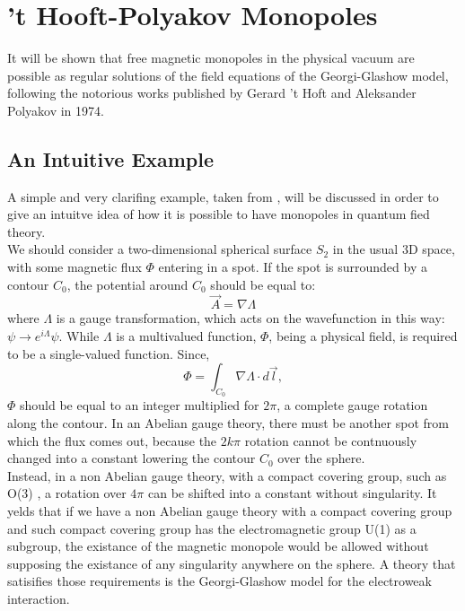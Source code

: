 \documentclass[main.tex]{subfiles}
\begin{document}
\section{’t Hooft-Polyakov Monopoles}
It will be shown that free magnetic monopoles in the physical vacuum are possible as regular solutions of the field equations of the Georgi-Glashow model, following the notorious works published by Gerard 't Hoft \cite{Hof:Mon} and Aleksander Polyakov \cite{Pol:Mon} in 1974. 
\subsection{An Intuitive Example}
A simple and very clarifing example, taken from \cite{Hof:Mon}, will be discussed in order to give an intuitve idea of how it is possible to have monopoles in quantum fied theory.  \\
We should consider a two-dimensional spherical surface $S_2$ in the usual 3D space, with some magnetic flux $\Phi$ entering in a spot. If the spot is surrounded by a contour $C_0$, the potential around $C_0$ should be equal to: 
\begin{equation}
    \Vec{A}= \nabla \Lambda 
\end{equation}
where $\Lambda$ is a gauge transformation, which acts on the wavefunction in this way: $\psi \rightarrow e^{i\Lambda} \psi $. 
While $\Lambda$ is a multivalued function, $\Phi$, being a physical field, is required to be a single-valued function. Since, 
\begin{equation}
    \Phi = \int_{C_0} \nabla \Lambda \cdot d\Vec{l},
\end{equation} 
$\Phi$ should be equal to an integer multiplied for $2 \pi  $, a complete gauge rotation along the contour. 
In an Abelian gauge theory, there must be another spot from which the flux comes out, because the $2k \pi$ rotation cannot be contnuously changed into a constant lowering the contour $C_0$ over the sphere. \\ 
Instead, in a non Abelian gauge theory, with a compact covering group, such as O(3) , a rotation over $4\pi$ can be shifted into a constant without singularity.
It yelds that if we have a non Abelian gauge theory with a compact covering group and such compact covering group has the electromagnetic group U(1) as a subgroup, the existance of the magnetic monopole would be allowed without supposing the existance of any singularity anywhere on the sphere.
A theory that satisifies those requirements is the Georgi-Glashow model for the electroweak interaction.
\end{document}
